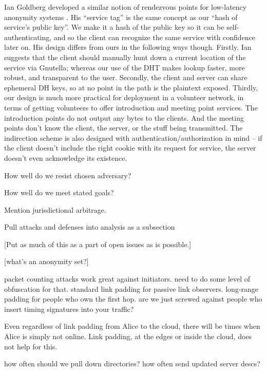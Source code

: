 \documentclass[times,10pt,twocolumn]{article}
\begin{document}
Ian Goldberg developed a similar notion of rendezvous points for
low-latency anonymity systems \cite{ian-thesis}. His ``service tag''
is the same concept as our ``hash of service's public key''. We make it
a hash of the public key so it can be self-authenticating, and so the
client can recognize the same service with confidence later on. His
design differs from ours in the following ways though. Firstly, Ian
suggests that the client should manually hunt down a current location of
the service via Gnutella; whereas our use of the DHT makes lookup faster,
more robust, and transparent to the user. Secondly, the client and server
can share ephemeral DH keys, so at no point in the path is the plaintext
exposed. Thirdly, our design is much more practical for deployment in a
volunteer network, in terms of getting volunteers to offer introduction
and meeting point services. The introduction points do not output any
bytes to the clients. And the meeting points don't know the client,
the server, or the stuff being transmitted. The indirection scheme
is also designed with authentication/authorization in mind -- if the
client doesn't include the right cookie with its request for service,
the server doesn't even acknowledge its existence.


How well do we resist chosen adversary?

How well do we meet stated goals?

Mention jurisdictional arbitrage.

Pull attacks and defenses into analysis as a subsection

\label{sec:maintaining-anonymity}

[Put as much of this as a part of open issues as is possible.]

[what's an anonymity set?]

packet counting attacks work great against initiators. need to do some
level of obfuscation for that. standard link padding for passive link
observers. long-range padding for people who own the first hop. are
we just screwed against people who insert timing signatures into your
traffic?

Even regardless of link padding from Alice to the cloud, there will be
times when Alice is simply not online. Link padding, at the edges or
inside the cloud, does not help for this.

how often should we pull down directories? how often send updated
server descs?
\end{document}
